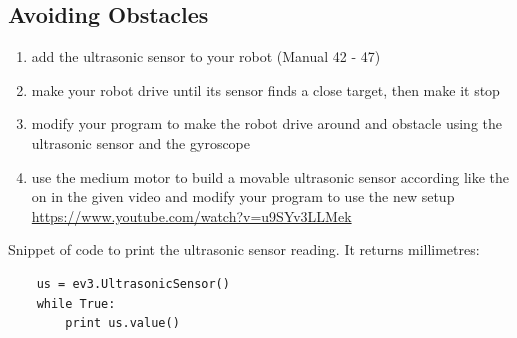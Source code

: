 \documentclass{article}
\begin{document}
  \subsection{Avoiding Obstacles}
  \begin{enumerate}
    \item add the ultrasonic sensor to your robot (Manual 42 - 47)
    \item make your robot drive until its sensor finds a close target, then make it stop
    \item modify your program to make the robot drive around and obstacle using the ultrasonic
        sensor and the gyroscope
    \item use the medium motor to build a movable ultrasonic sensor according like the on
        in the given video and modify your program to use the new setup \\
        \url{https://www.youtube.com/watch?v=u9SYv3LLMek}
  \end{enumerate}

  Snippet of code to print the ultrasonic sensor reading. It returns millimetres:
  \begin{verbatim}
    us = ev3.UltrasonicSensor()
    while True:
        print us.value()
  \end{verbatim}
\end{document}
